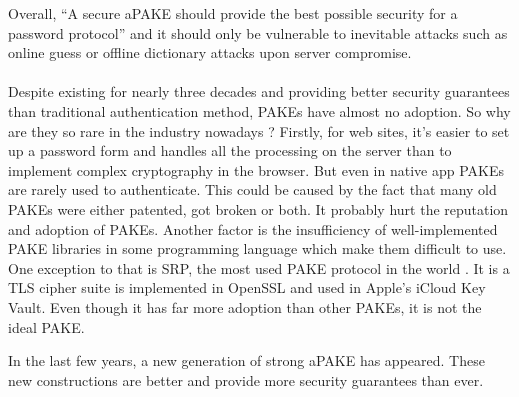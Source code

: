 ﻿\documentclass[../report.tex]{subfiles}
\begin{document}
Overall, ``A secure aPAKE should provide the best possible security for a password protocol'' \cite{OPAQUE_Standard_Draft} and it should only be vulnerable to inevitable attacks such as online guess or offline dictionary attacks upon server compromise.
\paragraph{}

Despite existing for nearly three decades and providing better security guarantees than traditional authentication method, PAKEs have almost no adoption. So why are they so rare in the industry nowadays ?
Firstly, for web sites, it's easier to set up a password form and handles all the processing on the server than to implement complex cryptography in the browser. But even in native app PAKEs are rarely used to authenticate.
This could be caused by the fact that many old PAKEs were either patented, got broken or both. %
It probably hurt the reputation and adoption of PAKEs.
Another factor is the insufficiency of well-implemented PAKE libraries in some programming language %
which make them difficult to use.
One exception to that is SRP, the most used PAKE protocol in the world \cite{PAKE_Green_blog}.
It is a TLS cipher suite is implemented in OpenSSL and used in Apple's iCloud Key Vault. Even though it has far more adoption than other PAKEs, it is not the ideal PAKE.

In the last few years, a new generation of strong aPAKE \cite{OPAQUE_Paper, KHAPE_Paper} has appeared. These new constructions are better and provide more security guarantees than ever.

\end{document}
